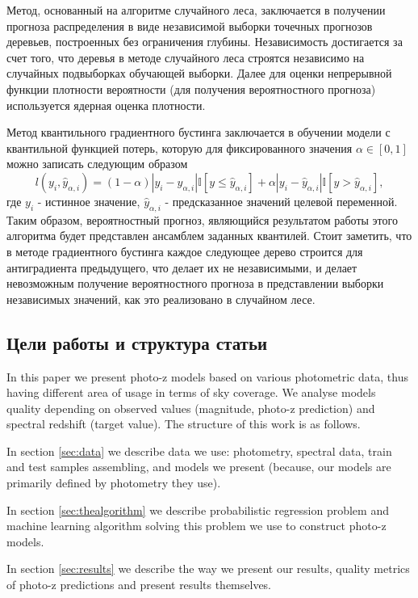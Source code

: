 \documentclass[fleqn,usenatbib]{mnras}
\begin{document}
Метод, основанный на алгоритме случайного леса, заключается в получении прогноза распределения в виде независимой выборки точечных прогнозов деревьев, построенных без ограничения глубины. Независимость достигается за счет того, что деревья в методе случайного леса строятся независимо на случайных подвыборках обучающей выборки. Далее для оценки непрерывной функции плотности вероятности (для получения вероятностного прогноза) используется ядерная оценка плотности.

Метод квантильного градиентного бустинга заключается в обучении модели с квантильной функцией потерь, которую для фиксированного значения \(\alpha \in [0,1]\) можно записать следующим образом
\begin{equation}
    l(y_i, \hat{y}_{\alpha, i}) = (1-\alpha)|y_i - \hat{y}_{\alpha, i}|\mathbb{I}[y \leq \hat{y}_{\alpha, i}] + \alpha|y_i - \hat{y}_{\alpha, i}|\mathbb{I}[y > \hat{y}_{\alpha, i}],
\end{equation}
где \(y_i\) - истинное значение, \(\hat{y}_{\alpha, i}\) - предсказанное значений целевой переменной. Таким образом, вероятностный прогноз, являющийся результатом работы этого алгоритма будет представлен ансамблем заданных квантилей. Стоит заметить, что в методе градиентного бустинга каждое следующее дерево строится для антиградиента предыдущего, что делает их не независимыми, и делает невозможным получение вероятностного прогноза в представлении выборки независимых значений, как это реализовано в случайном лесе.

\subsection{Цели работы и структура статьи}
In this paper we present photo-z models based on various photometric data, thus having different area of usage in terms of sky coverage. We analyse models quality depending on observed values (magnitude, photo-z prediction) and spectral redshift (target value). The structure of this work is as follows.

In section \ref{sec:data} we describe data we use: photometry, spectral data, train and test samples assembling, and models we present (because, our models are primarily defined by photometry they use).

In section \ref{sec:thealgorithm} we describe probabilistic regression problem and machine learning algorithm solving this problem we use to construct photo-z models.

In section \ref{sec:results} we describe the way we present our results, quality metrics of photo-z predictions and present results themselves.
\end{document}
